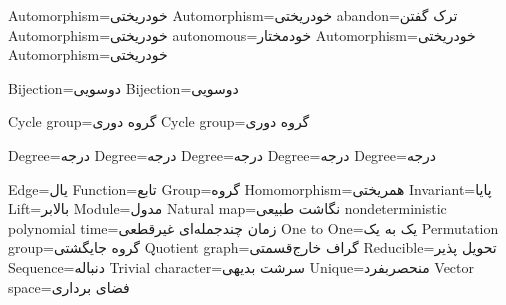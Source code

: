 
Automorphism=خودریختی
Automorphism=خودریختی
abandon=ترک گفتن
Automorphism=خودریختی
autonomous=خودمختار
Automorphism=خودریختی
Automorphism=خودریختی

Bijection=دوسویی
Bijection=دوسویی

Cycle group=گروه دوری
Cycle group=گروه دوری

Degree=درجه
Degree=درجه
Degree=درجه
Degree=درجه
Degree=درجه

Edge=یال
Function=تابع
Group=گروه
Homomorphism=همریختی
Invariant=پایا
Lift=بالابر
Module=مدول
Natural map=نگاشت طبیعی
nondeterministic polynomial time=زمان چندجمله‌ای غیرقطعی
One to One=یک به یک
Permutation group=گروه جایگشتی
Quotient graph=گراف خارج‌قسمتی
Reducible=تحویل پذیر
Sequence=دنباله
Trivial character=سرشت بدیهی
Unique=منحصربفرد
Vector space=فضای برداری

